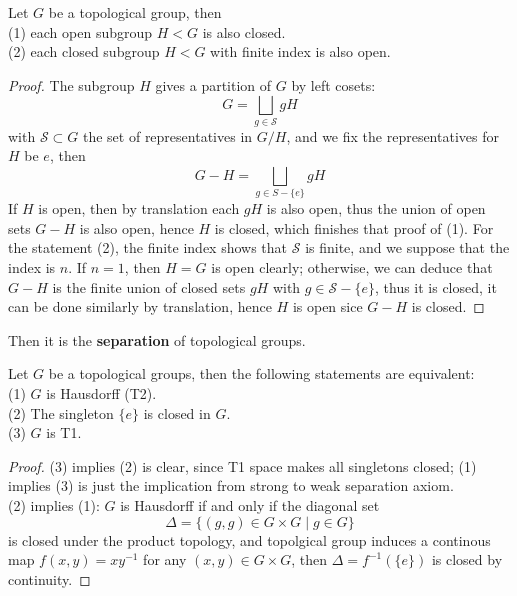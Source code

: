 \begin{colorproposition} \label{openiscloesd}
    Let \(G\) be a topological group, then\\

    (1) each open subgroup \(H < G\) is also closed.\\

    (2) each closed subgroup \(H < G\) with finite index is also open.

\end{colorproposition}

\begin{proof}
    The subgroup \(H\) gives a partition of \(G\) by left cosets:
    \[G = \bigsqcup_{g \in \mathcal{S}} gH\]
    with \(\mathcal{S} \subset G\) the set of representatives in \(G/H\), and we fix the representatives for \(H\) be \(e\), then
    \[G - H = \bigsqcup_{g \in S-\{e\}}gH\]
    If \(H\) is open, then by translation each \(gH\) is also open, thus the union of open sets \(G-H\) is also open, hence \(H\) is closed, which finishes that proof of (1). For the statement (2), the finite index shows that \(\mathcal{S}\) is finite, and we suppose that the index is \(n\). If \(n=1\), then \(H = G\) is open clearly; otherwise, we can deduce that \(G-H\) is the finite union of closed sets \(gH\) with \(g \in \mathcal{S}-\{e\}\), thus it is closed, it can be done similarly by translation, hence \(H\) is open sice \(G-H\) is closed.
\end{proof}


Then it is the \textbf{separation} of topological groups.
\begin{colorproposition}
    Let \(G\) be a topological groups, then the following statements are equivalent:\\

    (1) \(G\) is Hausdorff (T2).\\

    (2) The singleton \(\{e\}\) is closed in \(G\).\\

    (3) \(G\) is T1.
\end{colorproposition}

\begin{proof}
    (3) implies (2) is clear, since T1 space makes all singletons closed; (1) implies (3) is just the implication from strong to weak separation axiom.\\
    
    (2) implies (1): \(G\) is Hausdorff if and only if the diagonal set
    \[\Delta = \{(g,g) \in G \times G \mid g\in G\}\]
    is closed under the product topology, and topolgical group induces a continous map \(f(x,y) = xy^{-1}\) for any \((x,y) \in G \times G\), then \(\Delta = f^{-1}(\{e\})\) is closed by continuity.
\end{proof}

